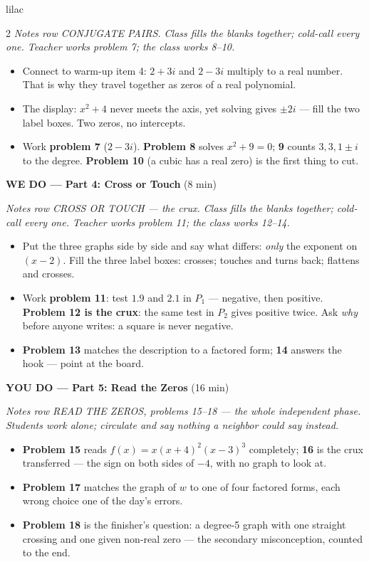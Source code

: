 \documentclass[10pt]{article}
\begin{document}
\begin{skillbox}{lilac}
\begin{multicols}{2}
\textit{Notes row CONJUGATE PAIRS. Class fills the blanks together; cold-call every one.
Teacher works problem 7; the class works 8--10.}
\begin{itemize}
  \item Connect to warm-up item 4: $2 + 3i$ and $2 - 3i$ multiply to a real number. That is
        why they travel together as zeros of a real polynomial.
  \item The display: $x^2 + 4$ never meets the axis, yet solving gives $\pm 2i$ --- fill the
        two label boxes. Two zeros, no intercepts.
  \item Work \textbf{problem 7} ($2 - 3i$). \textbf{Problem 8} solves $x^2 + 9 = 0$;
        \textbf{9} counts $3, 3, 1 \pm i$ to the degree. \textbf{Problem 10} (a cubic has a
        real zero) is the first thing to cut.
\end{itemize}

\textbf{WE DO --- Part 4: Cross or Touch} (8 min)

\textit{Notes row CROSS OR TOUCH --- the crux. Class fills the blanks together; cold-call
every one. Teacher works problem 11; the class works 12--14.}
\begin{itemize}
  \item Put the three graphs side by side and say what differs: \textit{only} the exponent on
        $(x - 2)$. Fill the three label boxes: crosses; touches and turns back; flattens and
        crosses.
  \item Work \textbf{problem 11}: test $1.9$ and $2.1$ in $P_1$ --- negative, then positive.
        \textbf{Problem 12 is the crux}: the same test in $P_2$ gives positive twice. Ask
        \textit{why} before anyone writes: a square is never negative.
  \item \textbf{Problem 13} matches the description to a factored form; \textbf{14} answers the
        hook --- point at the board.
\end{itemize}

\textbf{YOU DO --- Part 5: Read the Zeros} (16 min)

\textit{Notes row READ THE ZEROS, problems 15--18 --- the whole independent phase. Students
work alone; circulate and say nothing a neighbor could say instead.}
\begin{itemize}
  \item \textbf{Problem 15} reads $f(x) = x(x + 4)^2(x - 3)^3$ completely; \textbf{16} is the
        crux transferred --- the sign on both sides of $-4$, with no graph to look at.
  \item \textbf{Problem 17} matches the graph of $w$ to one of four factored forms, each wrong
        choice one of the day's errors.
  \item \textbf{Problem 18} is the finisher's question: a degree-5 graph with one straight
        crossing and one given non-real zero --- the secondary misconception, counted to the
        end.
\end{itemize}
\end{multicols}
\end{skillbox}
\end{document}
